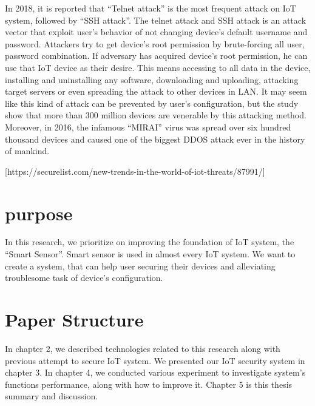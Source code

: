 In 2018, it is reported that “Telnet attack” is the most frequent attack on IoT system, followed by “SSH attack”. The telnet attack and SSH attack is an attack vector that exploit user’s behavior of not changing device’s default username and password. Attackers try to get device’s root permission by brute-forcing all user, password combination. If adversary has acquired device’s root permission, he can use that IoT device as their desire. This means accessing to all data in the device, installing and uninstalling any software, downloading and uploading, attacking target servers or even spreading the attack to other devices in LAN. It may seem like this kind of attack can be prevented by user’s configuration, but the study show that more than 300 million devices are venerable by this attacking method. Moreover, in 2016, the infamous “MIRAI” virus was spread over six hundred thousand devices and caused one of the biggest DDOS attack ever in the history of mankind.  

[https://securelist.com/new-trends-in-the-world-of-iot-threats/87991/] 

\section{purpose}
In this research, we prioritize on improving the foundation of IoT system, the “Smart Sensor”. Smart sensor is used in almost every IoT system. We want to create a system, that can help user securing their devices and alleviating troublesome task of device’s configuration.   

\section{Paper Structure}
In chapter 2, we described technologies related to this research along with previous attempt to secure IoT system. We presented our IoT security system in chapter 3. In chapter 4, we conducted various experiment to investigate system’s functions performance, along with how to improve it. Chapter 5 is this thesis summary and discussion. 